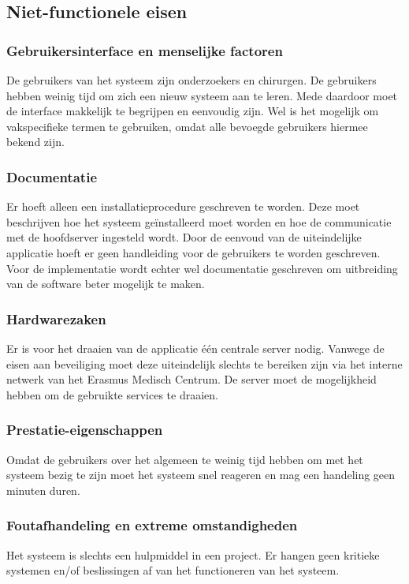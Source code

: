 \subsection{Niet-functionele eisen}
\label{nietfunctioneleeisen}

\subsubsection{Gebruikersinterface en menselijke factoren}
De gebruikers van het systeem zijn onderzoekers en chirurgen. 
De gebruikers hebben weinig tijd om zich een nieuw systeem aan te leren. 
Mede daardoor moet de interface makkelijk te begrijpen en eenvoudig zijn. 
Wel is het mogelijk om vakspecifieke termen te gebruiken, omdat alle bevoegde gebruikers hiermee bekend zijn.

\subsubsection{Documentatie}
Er hoeft alleen een installatieprocedure geschreven te worden. 
Deze moet beschrijven hoe het systeem ge\"installeerd moet worden en hoe de communicatie met de hoofdserver ingesteld wordt. 
Door de eenvoud van de uiteindelijke applicatie hoeft er geen handleiding voor de gebruikers te worden geschreven.
Voor de implementatie wordt echter wel documentatie geschreven om uitbreiding van de software beter mogelijk te maken.

\subsubsection{Hardwarezaken}
Er is voor het draaien van de applicatie \'e\'en centrale server nodig.
Vanwege de eisen aan beveiliging moet deze uiteindelijk slechts te bereiken zijn via het interne netwerk van het Erasmus Medisch Centrum. 
De server moet de mogelijkheid hebben om de gebruikte services te draaien. 

\subsubsection{Prestatie-eigenschappen}
Omdat de gebruikers over het algemeen te weinig tijd hebben om met het systeem bezig te zijn moet het systeem snel reageren en mag een handeling geen minuten duren.

\subsubsection{Foutafhandeling en extreme omstandigheden}
Het systeem is slechts een hulpmiddel in een project. Er hangen geen kritieke systemen en/of beslissingen af van het functioneren van het systeem.


